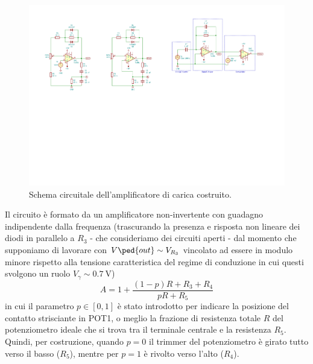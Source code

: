 \documentclass[10pt, a4paper, italian]{article}
\begin{document}
\begin{figure}[htbp]
    \centering
	\includegraphics[scale=1.2]{aloopschm}
    \caption{Schema circuitale dell'amplificatore di carica costruito.
    \label{fig: aloopschm}}
\end{figure}

Il circuito è formato da un amplificatore non-invertente con guadagno
indipendente dalla frequenza (trascurando la presenza e risposta non lineare
dei diodi in parallelo a $R_3$ - che consideriamo dei circuiti aperti - dal
momento che supponiamo di lavorare con $V\ped{out} \sim V_{R_3}$ vincolato ad
essere in modulo minore rispetto alla tensione caratteristica del regime di
conduzione in cui questi svolgono un ruolo $V_\gamma \sim \SI{0.7}{\V}$)
\begin{equation}\label{eq: A}
A  = 1 + \frac{(1 - p)R + R_3 + R_4}{pR + R_5}
\end{equation}
in cui il parametro $p \in [0,1]$ è stato introdotto per indicare la posizione
del contatto strisciante in POT1, o meglio la frazione di resistenza
totale $R$ del potenziometro ideale che si trova tra il terminale centrale e
la resistenza $R_5$. Quindi, per costruzione, quando $p = 0$ il trimmer del
potenziometro è girato tutto verso il basso ($R_5$), mentre per $p = 1$ è
rivolto verso l'alto ($R_4$).
\end{document}
